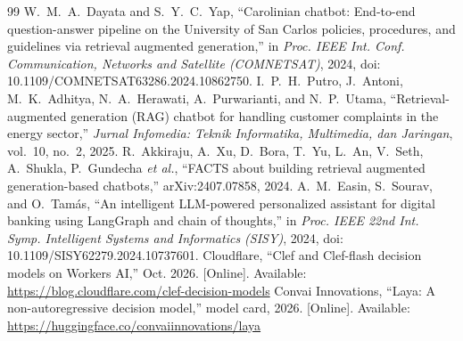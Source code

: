 \documentclass[conference]{IEEEtran}
\begin{document}
\begin{thebibliography}{99}
 W.~M.~A.~Dayata and S.~Y.~C.~Yap, ``Carolinian chatbot: End-to-end question-answer pipeline on the University of San Carlos policies, procedures, and guidelines via retrieval augmented generation,'' in \emph{Proc. IEEE Int. Conf. Communication, Networks and Satellite (COMNETSAT)}, 2024, doi: 10.1109/COMNETSAT63286.2024.10862750.
 I.~P.~H.~Putro, J.~Antoni, M.~K.~Adhitya, N.~A.~Herawati, A.~Purwarianti, and N.~P.~Utama, ``Retrieval-augmented generation (RAG) chatbot for handling customer complaints in the energy sector,'' \emph{Jurnal Infomedia: Teknik Informatika, Multimedia, dan Jaringan}, vol.~10, no.~2, 2025.
 R.~Akkiraju, A.~Xu, D.~Bora, T.~Yu, L.~An, V.~Seth, A.~Shukla, P.~Gundecha \emph{et al.}, ``FACTS about building retrieval augmented generation-based chatbots,'' arXiv:2407.07858, 2024.
 A.~M.~Easin, S.~Sourav, and O.~Tam\'as, ``An intelligent LLM-powered personalized assistant for digital banking using LangGraph and chain of thoughts,'' in \emph{Proc. IEEE 22nd Int. Symp. Intelligent Systems and Informatics (SISY)}, 2024, doi: 10.1109/SISY62279.2024.10737601.
 Cloudflare, ``Clef and Clef-flash decision models on Workers AI,'' Oct. 2026. [Online]. Available: \url{https://blog.cloudflare.com/clef-decision-models}
 Convai Innovations, ``Laya: A non-autoregressive decision model,'' model card, 2026. [Online]. Available: \url{https://huggingface.co/convaiinnovations/laya}
\end{thebibliography}
\end{document}
